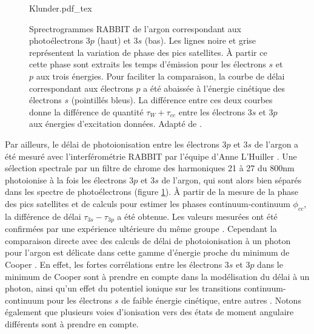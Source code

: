\begin{figure}[h]
\centering
\def\svgwidth{0.6\columnwidth}
{Klunder.pdf_tex}
\caption{Sprectrogrammes RABBIT de l'argon correspondant aux photoélectrons $3p$ (haut) et $3s$ (bas). Les lignes noire et grise représentent la variation de phase des pics satellites. \`A partir ce cette phase sont extraits les temps d'émission pour les électrons $s$ et $p$ aux trois énergies. Pour faciliter la comparaison, la courbe de délai correspondant aux électrons $p$ a été abaissée à l'énergie cinétique des électrons $s$ (pointillés bleus). La différence entre ces deux courbes donne la différence de quantité $\tau_W + \tau_{cc}$ entre les électrons $3s$ et $3p$ aux énergies d'excitation données. Adapté de .}
\label{fig:Klunder}
\end{figure}

Par ailleurs, le délai de photoionisation entre les électrons $3p$ et $3s$ de l'argon a été mesuré avec l'interférométrie RABBIT par l'équipe d'Anne L'Huiller . Une sélection spectrale par un filtre de chrome des harmoniques 21 à 27 du 800nm photoionise à la fois les électrons $3p$ et $3s$ de l'argon, qui sont alors bien séparés dans les spectre de photoélectrons (figure \ref{fig:Klunder}). \`A partir de la mesure de la phase des pics satellites et de calculs pour estimer les phases continuum-continuum $\phi_{cc}$, la différence de délai $\tau_{3s} - \tau_{3p}$ a été obtenue. Les valeurs mesurées ont été confirmées par une expérience ultérieure du même groupe . Cependant la comparaison directe avec des calculs de délai de photoionisation à un photon pour l'argon est délicate dans cette gamme d'énergie proche du minimum de Cooper . En effet, les fortes corrélations entre les électrons $3s$ et $3p$ dans le minimum de Cooper sont à prendre en compte dans la modélisation du délai à un photon, ainsi qu'un effet du potentiel ionique sur les transitions continuum-continuum pour les électrons $s$ de faible énergie cinétique, entre autres . Notons également que plusieurs voies d'ionisation vers des états de moment angulaire différents sont à prendre en compte.

